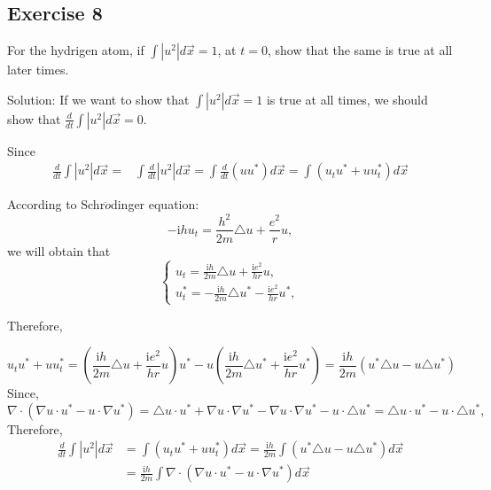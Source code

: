 \documentclass{article}
\begin{document}
		\subsection{Exercise 8}
	For the hydrigen atom, if $ \int \left | u^2 \right | d \vec{x } =1$, at $t=0$, show that the same is true at all later times.
		
		Solution: If we want to show that $ \int \left | u^2 \right | d \vec{x } =1$ is true at all times, we should show that $\frac{d}{dt}\int \left | u^2 \right | d \vec{x } =0$.
                  
		Since
		\begin{align*}
			 \frac{d}{dt}\int \left | u^2 \right | d \vec{x } =&
			 \int \frac{d}{dt} \left | u^2 \right | d \vec{x }=
			 \int \frac{d}{dt} \left(uu^* \right)d \vec{x }=
			 \int\left(  u_{t}u^*+uu_{t}^*\right) d \vec{x }
		\end{align*}

		According to Schr$\ddot{o}$dinger equation: 
		\[-\mathrm{i}hu_{t}=\frac{h^2}{2m}\triangle u+ \frac{e^2}{r}u,\]
		we will obtain that
		\begin{equation*}
			\begin{cases}
				u_{t}=\frac{\mathrm{i}h}{2m}\triangle u+ \frac{\mathrm{i}e^2}{hr}u,
				\\
				u_{t}^*=-\frac{\mathrm{i}h}{2m}\triangle u^*-\frac{\mathrm{i}e^2}{hr}u^*,
			\end{cases}
		\end{equation*}
		

		Therefore,

			\[u_{t}u^*+uu_{t}^*=(\frac{\mathrm{i}h}{2m}\triangle u+\frac{\mathrm{i}e^2}{hr}u)u^*-u(\frac{\mathrm{i}h}{2m}\triangle u^*+\frac{\mathrm{i}e^2}{hr}u^*)= \frac{\mathrm{i}h}{2m} (u^*\triangle u -u\triangle u^*) \]
			Since, \[\nabla \cdot (\nabla u \cdot u^* -u\cdot \nabla u^*)= \triangle u \cdot u^*+ \nabla u\cdot \nabla u^*- \nabla u\cdot \nabla u^*- u\cdot\triangle u^*=\triangle u \cdot u^*-u\cdot\triangle u^*,\]
			Therefore,
		    \begin{equation*}
				\begin{aligned}
					\frac{d}{dt}\int \left | u^2 \right | d \vec{x }&=\int(u_{t}u^*+uu_{t}^*)  d \vec{x } = \frac{\mathrm{i}h}{2m}\int(u^*\triangle u -u\triangle u^*)d \vec{x }\\
					&=\frac{\mathrm{i}h}{2m}\int \nabla \cdot (\nabla u \cdot u^* -u\cdot \nabla u^*)d \vec{x }
				\end{aligned}
			\end{equation*}
					
\end{document}
